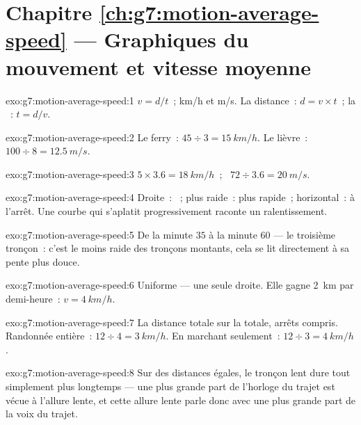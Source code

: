 \section*{Chapitre \ref{ch:g7:motion-average-speed} --- Graphiques du mouvement et vitesse moyenne}

\begin{solution}{exo:g7:motion-average-speed:1}
$v = d/t$~;  \unit{km/h} et \unit{m/s}. La distance~:
$d = v \times t$~; la ~: $t = d/v$.
\end{solution}

\begin{solution}{exo:g7:motion-average-speed:2}
Le ferry~: $45 \div 3 = \qty{15}{km/h}$. Le lièvre~:
$100 \div 8 = \qty{12.5}{m/s}$.
\end{solution}

\begin{solution}{exo:g7:motion-average-speed:3}
$5 \times 3.6 = \qty{18}{km/h}$~; \ $72 \div 3.6 = \qty{20}{m/s}$.
\end{solution}

\begin{solution}{exo:g7:motion-average-speed:4}
Droite~: ~; plus raide~: plus rapide~;
horizontal~: à l'arrêt. Une courbe qui s'aplatit progressivement
raconte un ralentissement.
\end{solution}

\begin{solution}{exo:g7:motion-average-speed:5}
De la minute $35$ à la minute $60$ --- le troisième tronçon~: c'est
le moins raide des tronçons montants, cela se lit directement à sa
pente plus douce.
\end{solution}

\begin{solution}{exo:g7:motion-average-speed:6}
Uniforme --- une seule droite. Elle gagne \qty{2}{km} par demi-heure~:
$v = \qty{4}{km/h}$.
\end{solution}

\begin{solution}{exo:g7:motion-average-speed:7}
La distance totale sur la  totale, arrêts compris. Randonnée
entière~: $12 \div 4 = \qty{3}{km/h}$. En marchant seulement~:
$12 \div 3 = \qty{4}{km/h}$.
\end{solution}

\begin{solution}{exo:g7:motion-average-speed:8}
Sur des distances égales, le tronçon lent dure tout simplement plus
longtemps --- une plus grande part de l'horloge du trajet est vécue à
l'allure lente, et cette allure lente parle donc avec une plus grande
part de la voix du trajet.
\end{solution}

